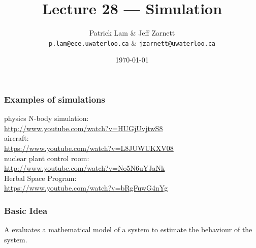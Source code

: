 
\usepackage{tikz-3dplot}

\title{Lecture 28 --- Simulation}

\author{Patrick Lam \& Jeff Zarnett \\ \small \texttt{p.lam@ece.uwaterloo.ca} \& \texttt{jzarnett@uwaterloo.ca}}
\date{\today}



\begin{frame}
  \titlepage
\end{frame}

\begin{frame}
\frametitle{Examples of simulations}

\begin{changemargin}{1cm}
physics N-body simulation:\\
\url{http://www.youtube.com/watch?v=HUGjUvjtwS8} \\[1em]

aircraft:\\
\url{https://www.youtube.com/watch?v=L8JUWUKXV08} \\[1em]

nuclear plant control room:\\
\url{http://www.youtube.com/watch?v=No5N6uYJaNk} \\[1em]

Herbal Space Program:\\
\url{https://www.youtube.com/watch?v=bRgFuwG4nYg}

\end{changemargin}

\end{frame}

\begin{frame}
\frametitle{Basic Idea}

\begin{changemargin}{1cm}
\huge

A  evaluates a mathematical model of a system
to estimate the behaviour of the system.

\end{changemargin}

\end{frame}

